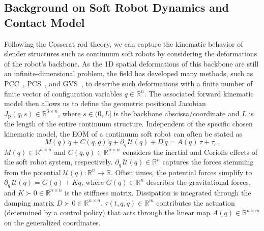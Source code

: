 \subsection{Background on Soft Robot Dynamics and Contact Model}
Following the Cosserat rod theory, we can capture the kinematic behavior of slender structures such as continuum soft robots by considering the deformations of the robot's backbone. As the 1D spatial deformations of this backbone are still an infinite-dimensional problem, the field has developed many methods, such as \gls{PCC}~\citep{webster2010design}, \gls{PCS}~\citep{renda2018discrete}, and \gls{GVS}~\citep{renda2020geometric}, to describe such deformations with a finite number of finite vector of configuration variables $q \in \mathbb{R}^n$. The associated forward kinematic model then allows us to define the geometric positional Jacobian $J_\mathrm{p}(q, s) \in \mathbb{R}^{3 \times n}$, where $s \in (0,L]$ is the backbone abscissa/coordinate and $L$ is the length of the entire continuum structure.
Independent of the specific chosen kinematic model, the \gls{EOM} of a continuum soft robot can often be stated as~\citep{armanini2023soft, della2023model}
\begin{equation}\label{eq:safetymetric:soft_robot_configuration_space_dynamics}
    M(q) \, \ddot{q} + C(q, \dot{q}) \, \dot{q} + \partial_{q} \, \mathcal{U}(q) + D \, \dot{q} = A(q) \, \tau + \tau_\mathrm{c},
\end{equation}
$M(q) \in \mathbb{R}^{n \times n}$ and $C(q, \dot{q}) \in \mathbb{R}^{n \times n}$ considers the inertial and Coriolis effects of the soft robot system, respectively.
$\partial_{q} \, \mathcal{U}(q) \in \mathbb{R}^n$ captures the forces stemming from the potential $\mathcal{U}(q): \mathbb{R}^n \to \mathbb{R}$.
Often times, the potential forces simplify to $\partial_{q} \, \mathcal{U}(q) =  G(q) + K q$, where $G(q) \in \mathbb{R}^{n}$ describes the gravitational forces, and $K \succ 0 \in \mathbb{R}^{n \times n}$ is the stiffness matrix.
Dissipation is integrated through the damping matrix $D \succ 0 \in \mathbb{R}^{n \times n}$.
$\tau(t,q,\dot{q}) \in \mathbb{R}^{m}$ contributes the actuation (determined by a control policy) that acts through the linear map $A(q) \in \mathbb{R}^{n \times m}$ on the generalized coordinates.

